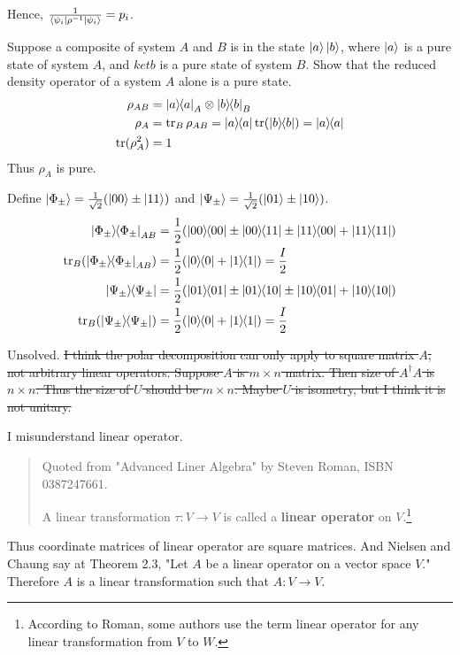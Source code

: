 Hence, $ \frac{1}{\braket{\psi_i | \rho^{-1} | \psi_i}} = p_i $.


 Suppose a composite of system $A$ and $B$ is in the state $\ket{a}\ket{b}$, where $\ket{a}$ is a pure state of system $A$, and $ket{b}$ is a pure state of system $B$.  Show that the reduced density operator of a system $A$ alone is a pure state.
\Soln 
\begin{align*}
	\rho_{AB} &= \ket{a}\hspace{-1mm} \bra{a}_A \otimes \ket{b}\hspace{-1mm} \bra{b}_B\\
	\rho_A &= \operatorname{tr}_{B} \rho_{AB} = \ket{a}\hspace{-1mm} \bra{a} \operatorname{tr} (\ket{b}\hspace{-1mm} \bra{b}) = \ket{a}\hspace{-1mm} \bra{a}\\
	\operatorname{tr} (\rho_A^2) &= 1
\end{align*}
Thus $\rho_A$ is pure.


Define $\ket{\Phi_\pm} = \frac{1}{\sqrt{2}} (\ket{00} \pm \ket{11})$ and $\ket{\Psi_\pm} = \frac{1}{\sqrt{2}} (\ket{01} \pm \ket{10})$.
\begin{align*}
	\kb{\Phi_\pm}_{AB} &= \frac{1}{2} (\kb{00} \pm \kbt{00}{11} \pm \kbt{11}{00} + \kb{11})\\
	\Tr_B (\kb{\Phi_\pm}_{AB}) &= \frac{1}{2} (\kb{0} + \kb{1}) = \frac{I}{2}\\
%
	\kb{\Psi_\pm} &= \frac{1}{2} (\kb{01} \pm \kbt{01}{10} \pm \kbt{10}{01} + \kb{10})\\
	\Tr_B (\kb{\Psi_\pm}) &= \frac{1}{2} (\kb{0} + \kb{1}) = \frac{I}{2}
\end{align*}



Unsolved. \sout{I think the polar decomposition can only apply to square matrix $A$, not arbitrary linear operators.
Suppose $A$ is $m \times n$ matrix. Then size of $A^\dagger A$ is $n \times n$. Thus the size of $U$ should be $m \times n$.
Maybe $U$ is isometry, but I think it is not unitary.}

I misunderstand linear operator.
\begin{quote}
	Quoted from "Advanced Liner Algebra" by Steven Roman, ISBN 0387247661.

	A linear transformation $\tau : V \rightarrow V$ is called a \textbf{linear operator} on $V$.\footnote{According to Roman, some authors use the term linear operator for any linear transformation from $V$ to $W$.}
\end{quote}
Thus coordinate matrices of linear operator are square matrices. And Nielsen and Chaung say at Theorem 2.3, "Let $A$ be a linear operator on a vector space $V$." Therefore $A$ is a linear transformation such that $A : V \rightarrow V$.

